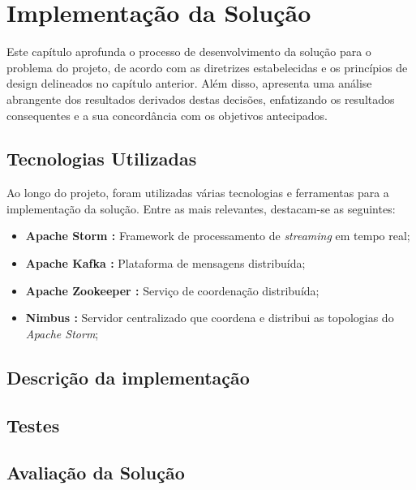 \chapter{Implementação da Solução}
\label{sec:4-Implementacao}

Este capítulo aprofunda o processo de desenvolvimento da solução para o problema do
projeto, de acordo com as diretrizes estabelecidas e os princípios de design delineados no
capítulo anterior. Além disso, apresenta uma análise abrangente dos resultados derivados destas 
decisões, enfatizando os resultados consequentes e a sua concordância com os objetivos antecipados.

\section{Tecnologias Utilizadas}

Ao longo do projeto, foram utilizadas várias tecnologias e ferramentas para a implementação da solução.
Entre as mais relevantes, destacam-se as seguintes:

\begin{itemize}
  \item \textbf{Apache Storm \cite{storm}:} Framework de processamento de \textit{streaming} em tempo real;
  \item \textbf{Apache Kafka \cite{kafka}:} Plataforma de mensagens distribuída;
  \item \textbf{Apache Zookeeper \cite{zookeeper}:} Serviço de coordenação distribuída;
  \item \textbf{Nimbus \cite{nimbus}:} Servidor centralizado que coordena e distribui as topologias 
    do \textit{Apache Storm};
\end{itemize}

\section{Descrição da implementação}


\section{Testes}


\section{Avaliação da Solução}

